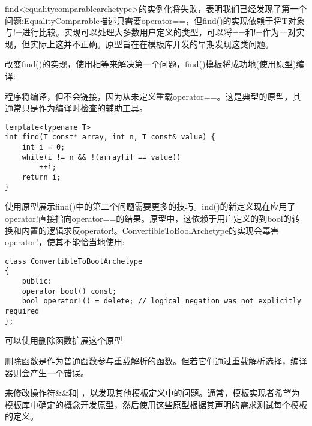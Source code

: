 find<equalitycomparablearchetype>的实例化将失败，表明我们已经发现了第一个问题:EqualityComparable描述只需要operator==，但find()的实现依赖于将T对象与!=进行比较。实现可以处理大多数用户定义的类型，可以将==和!=作为一对实现，但实际上这并不正确。原型旨在在模板库开发的早期发现这类问题。

改变find()的实现，使用相等来解决第一个问题，find()模板将成功地(使用原型)编译:

\begin{tcolorbox}[colback=webgreen!5!white,colframe=webgreen!75!black]
\hspace*{0.75cm}程序将编译，但不会链接，因为从未定义重载operator==。这是典型的原型，其通常只是作为编译时检查的辅助工具。
\end{tcolorbox}

\begin{lstlisting}[style=styleCXX]
template<typename T>
int find(T const* array, int n, T const& value) {
	int i = 0;
	while(i != n && !(array[i] == value))
		++i;
	return i;
}
\end{lstlisting}

使用原型展示find()中的第二个问题需要更多的技巧。ind()的新定义现在应用了operator!直接指向operator==的结果。原型中，这依赖于用户定义的到bool的转换和内置的逻辑求反operator!。ConvertibleToBoolArchetype的实现会毒害operator!，使其不能恰当地使用:

\begin{lstlisting}[style=styleCXX]
class ConvertibleToBoolArchetype
{
	public:
	operator bool() const;
	bool operator!() = delete; // logical negation was not explicitly required
};
\end{lstlisting}

可以使用删除函数扩展这个原型

\begin{tcolorbox}[colback=webgreen!5!white,colframe=webgreen!75!black]
\hspace*{0.75cm}删除函数是作为普通函数参与重载解析的函数。但若它们通过重载解析选择，编译器则会产生一个错误。
\end{tcolorbox}

来修改操作符\&\&和||，以发现其他模板定义中的问题。通常，模板实现者希望为模板库中确定的概念开发原型，然后使用这些原型根据其声明的需求测试每个模板的定义。























